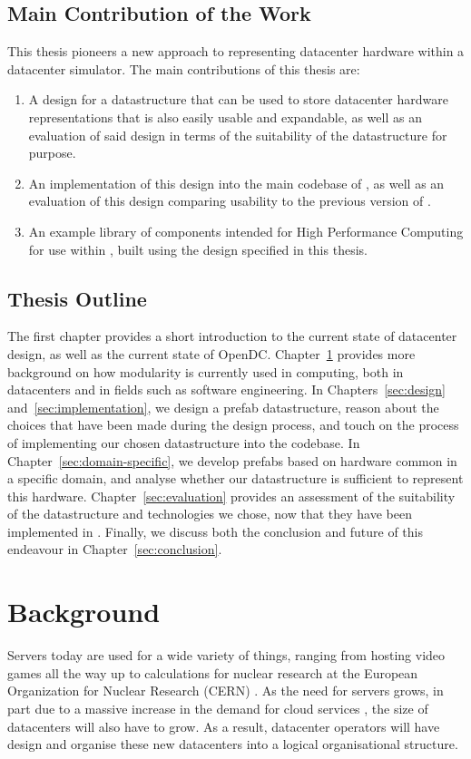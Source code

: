 \documentclass[11pt]{article}
\begin{document}
	\subsection{Main Contribution of the Work}
		This thesis pioneers a new approach to representing datacenter hardware within a datacenter simulator.
		The main contributions of this thesis are:
		\begin{enumerate}
			\item A design for a datastructure that can be used to store datacenter hardware representations that is also easily usable and expandable, as well as an evaluation of said design in terms of the suitability of the datastructure for purpose.
			\item An implementation of this design into the main codebase of \opendc{}, as well as an evaluation of this design comparing usability to the previous version of \opendc{}.
			\item An example library of components intended for High Performance Computing for use within \opendc{}, built using the design specified in this thesis.
		\end{enumerate}
	
	\subsection{Thesis Outline}
		The first chapter provides a short introduction to the current state of datacenter design, as well as the current state of OpenDC. 
		Chapter~\ref{sec:background} provides more background on how modularity is currently used in computing, both in datacenters and in fields such as software engineering. 
		In Chapters~\ref{sec:design} and~\ref{sec:implementation}, we design a prefab datastructure, reason about the choices that have been made during the design process, and touch on the process of implementing our chosen datastructure into the \opendc{} codebase.
		In Chapter~\ref{sec:domain-specific}, we develop prefabs based on hardware common in a specific domain, and analyse whether our datastructure is sufficient to represent this hardware.
		Chapter~\ref{sec:evaluation} provides an assessment of the suitability of the datastructure and technologies we chose, now that they have been implemented in \opendc{}.
		Finally, we discuss both the conclusion and future of this endeavour in Chapter~\ref{sec:conclusion}.
	

	

\newpage

\section{Background} \label{sec:background}
	Servers today are used for a wide variety of things, ranging from hosting video games all the way up to calculations for nuclear research at the European Organization for Nuclear Research (CERN) \cite{Andrade2012}.
	As the need for servers grows, in part due to a massive increase in the demand for cloud services \cite{Pring2009}, the size of datacenters will also have to grow.
	As a result, datacenter operators will have design and organise these new datacenters into a logical organisational structure.
\end{document}

